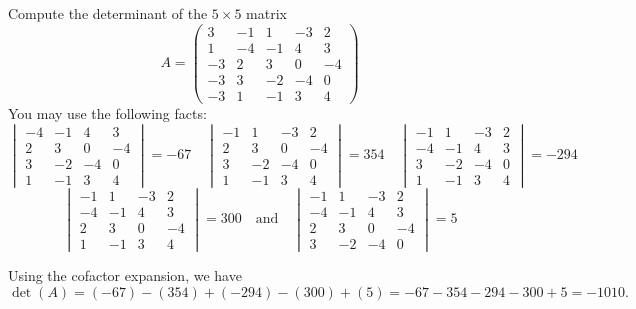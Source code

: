 \documentclass[12pt,a4paper]{article}
\theoremstyle{definition}
\begin{document}
\begin{question}
	Compute the determinant of the $5 \times 5$ matrix
%
\[ A = \begin{pmatrix}
		3 & -1 & 1 & -3 & 2\\
		1 & -4 & -1 & 4 & 3\\
		-3 & 2 & 3 & 0 & -4\\
		-3 & 3 & -2 & -4 & 0\\
		-3 & 1 & -1 & 3 & 4
	\end{pmatrix} \]
	You may use the following facts:
	\[ \begin{vmatrix} -4 & -1 & 4 & 3\\
		2 & 3 & 0 & -4\\
		3 & -2 & -4 & 0\\
		1 & -1 & 3 & 4 \end{vmatrix} = -67 \quad \begin{vmatrix} -1 & 1 & -3 & 2 \\ 2 & 3 & 0 & -4\\
			3 & -2 & -4 & 0\\
		1 & -1 & 3 & 4 \end{vmatrix} = 354 \quad \begin{vmatrix}
		-1 & 1 & -3 & 2 \\
		-4 & -1 & 4 & 3\\
		3 & -2 & -4 & 0\\
		1 & -1 & 3 & 4 \end{vmatrix} = -294 \]
	\[ \begin{vmatrix}
		-1 & 1 & -3 & 2 \\
		-4 & -1 & 4 & 3\\
		2 & 3 & 0 & -4\\
		1 & -1 & 3 & 4 \end{vmatrix} = 300 \quad\text{and}\quad \begin{vmatrix}
		-1 & 1 & -3 & 2 \\
		-4 & -1 & 4 & 3\\
		2 & 3 & 0 & -4\\
		3 & -2 & -4 & 0 \end{vmatrix} = 5 \]
\end{question}
\begin{solution}
	Using the cofactor expansion, we have
	\[ \det(A) = (-67) - (354) + (-294) - (300) + (5) = -67 - 354 - 294 - 300 + 5 = -1010. \]
\end{solution}
\end{document}
